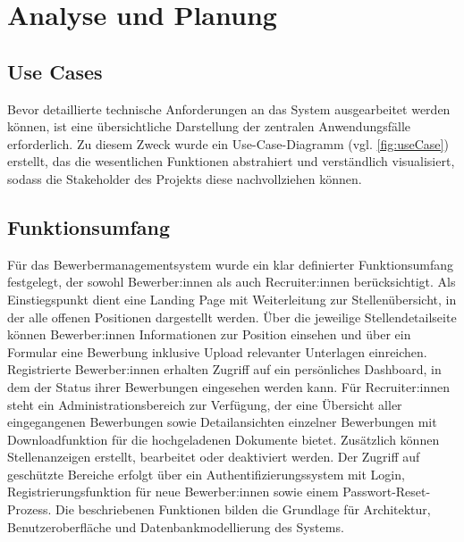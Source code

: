 \section{Analyse und Planung}
\subsection{Use Cases}
Bevor detaillierte technische Anforderungen an das System ausgearbeitet werden können, ist eine übersichtliche Darstellung der zentralen Anwendungsfälle erforderlich. 
Zu diesem Zweck wurde ein Use-Case-Diagramm (vgl. \ref{fig:useCase}) erstellt, das die wesentlichen Funktionen abstrahiert und verständlich visualisiert, sodass die Stakeholder des Projekts diese nachvollziehen können.

\subsection{Funktionsumfang}
Für das Bewerbermanagementsystem wurde ein klar definierter Funktionsumfang festgelegt, der sowohl Bewerber:innen als auch Recruiter:innen berücksichtigt. 
Als Einstiegspunkt dient eine Landing Page mit Weiterleitung zur Stellenübersicht, in der alle offenen Positionen dargestellt werden. 
Über die jeweilige Stellendetailseite können Bewerber:innen Informationen zur Position einsehen und über ein Formular eine Bewerbung inklusive Upload relevanter Unterlagen einreichen.
Registrierte Bewerber:innen erhalten Zugriff auf ein persönliches Dashboard, in dem der Status ihrer Bewerbungen eingesehen werden kann. 
\newline
Für Recruiter:innen steht ein Administrationsbereich zur Verfügung, der eine Übersicht aller eingegangenen Bewerbungen sowie Detailansichten einzelner Bewerbungen mit Downloadfunktion für die hochgeladenen Dokumente bietet. 
Zusätzlich können Stellenanzeigen erstellt, bearbeitet oder deaktiviert werden.
Der Zugriff auf geschützte Bereiche erfolgt über ein Authentifizierungssystem mit Login, Registrierungsfunktion für neue Bewerber:innen sowie einem Passwort-Reset-Prozess. 
Die beschriebenen Funktionen bilden die Grundlage für Architektur, Benutzeroberfläche und Datenbankmodellierung des Systems.

